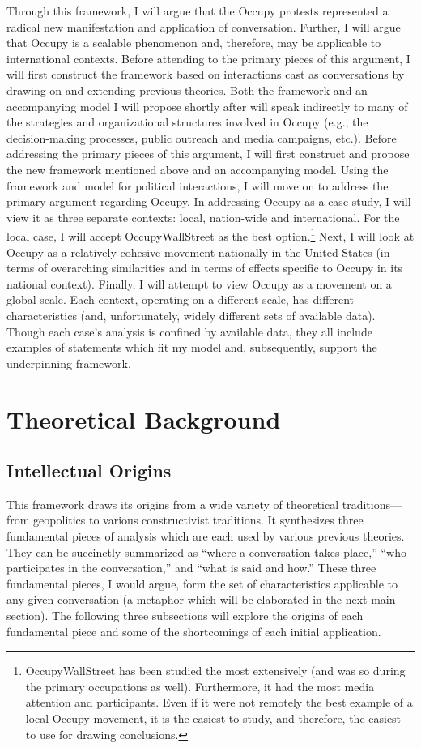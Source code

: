 \documentclass[openany,twoside]{memoir}
\begin{document}
\begin{Spacing}{2}
Through this framework, I will argue that the Occupy protests represented a radical new manifestation and application of conversation.
Further, I will argue that Occupy is a scalable phenomenon and, therefore, may be applicable to international contexts. 
Before attending to the primary pieces of this argument, I will first construct the framework based on interactions cast as conversations by drawing on and extending previous theories.
Both the framework and an accompanying model I will propose shortly after will speak indirectly to many of the strategies and organizational structures involved in Occupy (e.g., the decision-making processes, public outreach and media campaigns, etc.).
Before addressing the primary pieces of this argument, I will first construct and propose the new framework mentioned above and an accompanying model.
Using the framework and model for political interactions, I will move on to address the primary argument regarding Occupy.
In addressing Occupy as a case-study, I will view it as three separate contexts: local, nation-wide and international.
For the local case, I will accept OccupyWallStreet as the best option.\footnote{
OccupyWallStreet has been studied the most extensively (and was so during the primary occupations as well).
Furthermore, it had the most media attention and participants.
Even if it were not remotely the best example of a local Occupy movement, it is the easiest to study, and therefore, the easiest to use for drawing conclusions.}
Next, I will look at Occupy as a relatively cohesive movement nationally in the United States (in terms of overarching similarities and in terms of effects specific to Occupy in its national context).
Finally, I will attempt to view Occupy as a movement on a global scale.
Each context, operating on a different scale, has different characteristics (and, unfortunately, widely different sets of available data).
Though each case's analysis is confined by available data, they all include examples of statements which fit my model and, subsequently, support the underpinning framework.

\chapter{Theoretical Background}
\thispagestyle{fancy}
\section{Intellectual Origins}
This framework draws its origins from a wide variety of theoretical traditions---from geopolitics to various constructivist traditions.
It synthesizes three fundamental pieces of analysis which are each used by various previous theories.
They can be succinctly summarized as ``where a conversation takes place,'' ``who participates in the conversation,'' and ``what is said and how.''
These three fundamental pieces, I would argue, form the set of characteristics applicable to any given conversation (a metaphor which will be elaborated in the next main section).
The following three subsections will explore the origins of each fundamental piece and some of the shortcomings of each initial application.


\end{Spacing}
\end{document}
